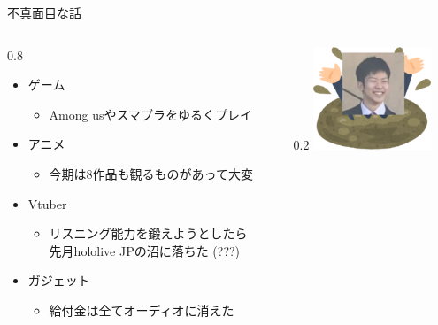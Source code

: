 \documentclass[aspectratio=169, dvipdfmx, 14pt, xcolor={svgnames,dvipsnames}]{beamer}
\newlength{\mytotalwidth}
\newlength{\mycolumnwidth}
\begin{document}
\begin{frame}{\quad 不真面目な話}
  \begin{columns}[totalwidth=\mytotalwidth]
    \begin{column}[t]{0.8\mycolumnwidth}
      \begin{itemize}
        \item ゲーム
              \begin{itemize}
                \item Among usやスマブラをゆるくプレイ
              \end{itemize}
        \item アニメ
              \begin{itemize}
                \item 今期は8作品も観るものがあって大変
              \end{itemize}
        \item Vtuber
              \begin{itemize}
                \item リスニング能力を鍛えようとしたら\\先月hololive JPの沼に落ちた (???)
              \end{itemize}
        \item ガジェット
              \begin{itemize}
                \item 給付金は全てオーディオに消えた
              \end{itemize}
      \end{itemize}
    \end{column}
    \begin{column}[T]{0.2\mycolumnwidth}
      \centering
      \includegraphics[width=100pt]{img/icon_marsh.png}
    \end{column}
  \end{columns}
\end{frame}
\end{document}
